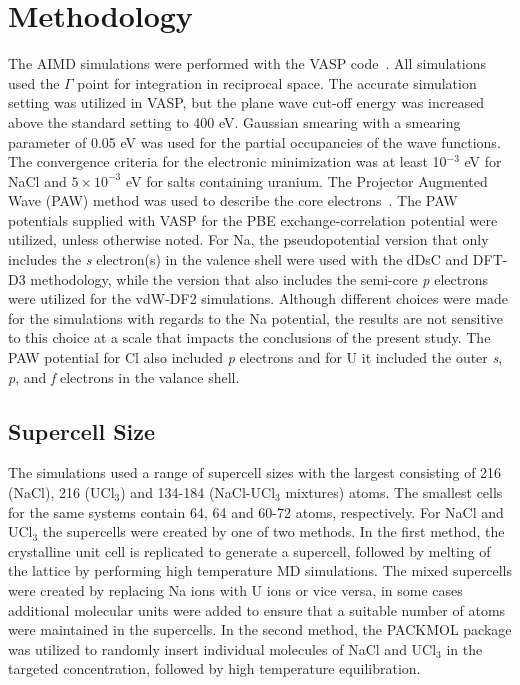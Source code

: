 \documentclass[preprint,3p,10pt,onecolumn,number,sort&compress]{elsarticle}
\begin{document}
\section{Methodology}
\label{sec:method}
The AIMD simulations were performed with the VASP code~\cite{Kresse1996}. All simulations used the $\Gamma$ point for integration in reciprocal space. The accurate simulation setting was utilized in VASP, but the plane wave cut-off energy was increased above the standard setting to 400 eV. Gaussian smearing with a smearing parameter of 0.05 eV was used for the partial occupancies of the wave functions. The convergence criteria for the electronic minimization was at least 10$^{-3}$ eV for NaCl and $5\times10^{-3}$ eV for salts containing uranium. The Projector Augmented Wave (PAW) method was used to describe the core electrons~\cite{PAW1,PAW2}. The PAW potentials supplied with VASP for the PBE exchange-correlation potential were utilized, unless otherwise noted. For Na, the pseudopotential version that only includes the \textit{s} electron(s) in the valence shell were used with the dDsC and DFT-D3 methodology, while the version that also includes the semi-core \textit{p} electrons were utilized for the vdW-DF2 simulations. Although different choices were made for the simulations with regards to the Na potential, the results are not sensitive to this choice at a scale that impacts the conclusions of the present study. The PAW potential for Cl also included \textit{p} electrons and for U it included the outer \textit{s}, \textit{p}, and \textit{f} electrons in the valance shell. 

\subsection{Supercell Size}
The simulations used a range of supercell sizes with the largest consisting of 216 (NaCl), 216 (UCl$_3$) and 134-184 (NaCl-UCl$_3$ mixtures) atoms. The smallest cells for the same systems contain 64, 64 and 60-72 atoms, respectively. %
For NaCl and UCl$_3$ the supercells were created by one of two methods. In the first method, the crystalline unit cell is replicated to generate a supercell, followed by melting of the lattice by performing high temperature MD simulations. The mixed supercells were created by replacing Na ions with U ions or vice versa, in some cases additional molecular units were added to ensure that a suitable number of atoms were maintained in the supercells. In the second method, the PACKMOL package \cite{packmol} was utilized to randomly insert individual molecules of NaCl and UCl$_3$ in the targeted concentration, followed by high temperature equilibration. 
\end{document}
